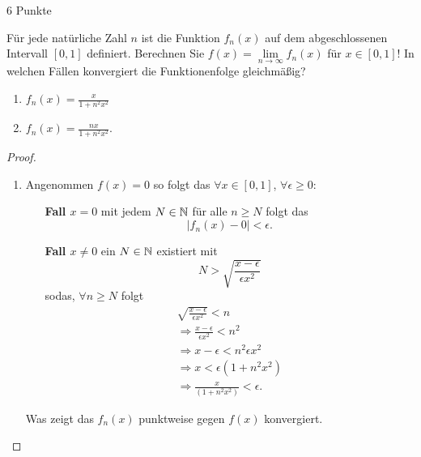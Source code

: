 \documentclass{problemset}
\author{Michael van Straten}
\begin{document}
\maketitle

\begin{problem}{6 Punkte}

Für jede natürliche Zahl $n$ ist die Funktion $f_n(x)$ auf dem abgeschlossenen
Intervall $[0, 1]$ definiert. Berechnen Sie $f(x) = \lim\limits_{n \to \infty}
    f_n(x)$ für $x \in [0, 1]$! In welchen Fällen konvergiert die Funktionenfolge
gleichmäßig?

\begin{enumerate}
    \item $f_n(x) = \frac{x}{1 + n^2x^2}$
    \item $f_n(x) = \frac{nx}{1 + n^2x^2}$.
\end{enumerate}

\begin{proof}
    \leavevmode
    \begin{enumerate}
        \item Angenommen \(f(x) = 0\) so folgt das \(\forall x \in \left[0,1\right]\),
              \(\forall \epsilon \ge 0\):
              \begin{itemize}
                  \item [\textbf{Fall \(x = 0\)}]
                        mit jedem \(N \in \mathbb{N}\) für alle \(n \ge N\) folgt das \[
                            |f_n(x) - 0| < \epsilon.
                        \]
                  \item [\textbf{Fall \(x \neq 0\)}]
                        ein \(N \in \mathbb{N}\) existiert mit \[
                            N > \sqrt{\frac{x - \epsilon}{\epsilon x^2}}
                        \] sodas, \(\forall n \ge N\) folgt
                        \begin{align*}
                            \sqrt{\frac{x - \epsilon}{\epsilon x^2}} < n        \\
                            \Rightarrow \frac{x - \epsilon}{\epsilon x^2} < n^2 \\
                            \Rightarrow x - \epsilon < n^2 \epsilon x^2         \\
                            \Rightarrow x < \epsilon (1 + n^2 x^2)              \\
                            \Rightarrow \frac{x}{(1 + n^2 x^2)} < \epsilon.
                        \end{align*}
              \end{itemize}
              Was zeigt das \(f_n(x)\) punktweise gegen \(f(x)\) konvergiert.


\end{enumerate}
\end{proof}
\end{problem}
\end{document}
